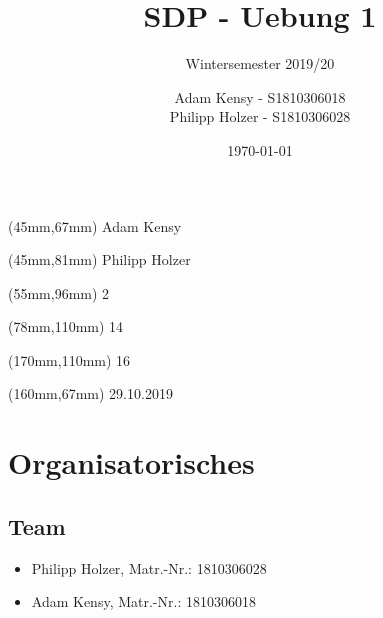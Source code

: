 


\title{SDP - Uebung 1} %
\subtitle{Wintersemester 2019/20} %
\author{Adam Kensy - S1810306018\\
		Philipp Holzer - S1810306028} %
\date{\today}


\begin{textblock*}{40mm}(45mm,67mm)
Adam Kensy	
\end{textblock*}
\begin{textblock*}{40mm}(45mm,81mm)
Philipp Holzer
\end{textblock*}
\begin{textblock*}{40mm}(55mm,96mm)		
2
\end{textblock*}
\begin{textblock*}{40mm}(78mm,110mm)
14
\end{textblock*}
\begin{textblock*}{40mm}(170mm,110mm)
16
\end{textblock*}
\begin{textblock*}{40mm}(160mm,67mm)
29.10.2019
\end{textblock*}



\maketitle %


\tableofcontents %

\newpage



\section{Organisatorisches}

\subsection{Team}
\begin{itemize}
	\item Philipp Holzer, Matr.-Nr.: 1810306028
	\item Adam Kensy, Matr.-Nr.: 1810306018
\end{itemize}

